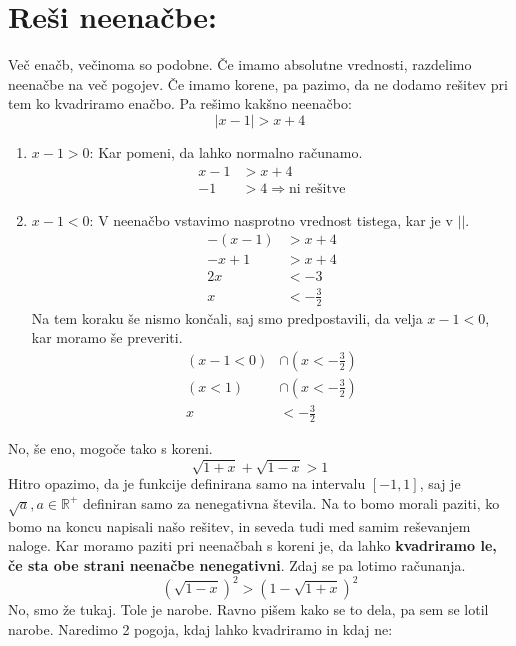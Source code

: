 \documentclass[12pt,a4paper,slovene]{article}
\begin{document}
\section{Reši neenačbe:}
Več enačb, večinoma so podobne. Če imamo absolutne vrednosti, razdelimo neenačbe na več pogojev. Če imamo korene, pa pazimo, da ne dodamo rešitev pri tem ko kvadriramo enačbo. Pa rešimo kakšno neenačbo:
\[|x - 1| > x + 4\]
\begin{enumerate}
    \item $x - 1 > 0$: Kar pomeni, da lahko normalno računamo.
    \begin{align*}
        x - 1 &> x + 4\\
        -1 &> 4 \Rightarrow \text{ni rešitve} 
    \end{align*}
    \item $x - 1 < 0$: V neenačbo vstavimo nasprotno vrednost tistega, kar je v $||$.
    \begin{align*}
        - (x - 1) &> x + 4\\
        -x  + 1 &> x + 4\\
        2x &< -3\\
        x &< -\frac{3}{2}
    \end{align*}
    Na tem koraku še nismo končali, saj smo predpostavili, da velja $x - 1 < 0$, kar moramo še preveriti.
    \begin{align*}
        \left(x - 1 < 0 \right) &\cap \left(x < -\frac{3}{2} \right)\\
        \left(x < 1 \right) &\cap \left( x < -\frac{3}{2} \right)\\
        x &< -\frac{3}{2}
    \end{align*}
\end{enumerate}
No, še eno, mogoče tako s koreni.
\[
\sqrt{1 + x} + \sqrt{1 - x} > 1
\]
Hitro opazimo, da je funkcije definirana samo na intervalu $\left[-1, 1\right]$, saj je $\sqrt{a}, a \in \mathbb{R}^+$ definiran samo za nenegativna števila. Na to bomo morali paziti, ko bomo na koncu napisali našo rešitev, in seveda tudi med samim reševanjem naloge.
Kar moramo paziti pri neenačbah s koreni je, da lahko \textbf{kvadriramo le, če sta obe strani neenačbe nenegativni}. Zdaj se pa lotimo računanja.
\[
\left( \sqrt{1 - x} \right)^2 > \left( 1 - \sqrt{1 + x} \right)^2
\]
No, smo že tukaj. Tole je narobe. Ravno pišem kako se to dela, pa sem se lotil narobe. Naredimo 2 pogoja, kdaj lahko kvadriramo in kdaj ne:
\end{document}
